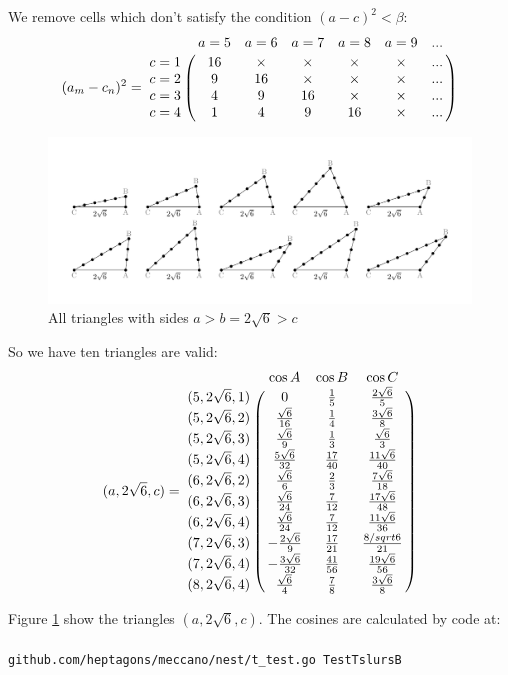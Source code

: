 \documentclass[11pt]{article}
\begin{document}
We remove cells which don't satisfy the condition $(a-c)^2 < \beta$:
\begin {equation}\label{E:12}
(a_m - c_n)^2 =\bordermatrix{~ & a=5 & a=6 & a=7 & a=8 & a=9 & ...\cr
c=1 & 16 & \times & \times & \times & \times & ...\cr    
c=2 &  9 & 16 & \times & \times & \times & ...\cr    
c=3 &  4 &  9 & 16 & \times & \times & ...\cr    
c=4 &  1 &  4 &  9 & 16 & \times & ...\cr}
\end {equation}

\begin{figure}[htp]
\centering
\includegraphics[scale=0.9]{tslurB}
\caption{All triangles with sides $a > b = 2\sqrt{6} > c$}
\label{tslurB}
\end{figure}

So we have ten triangles are valid:
\begin {equation}\label{E:13}
(a,2\sqrt{6},c) =\bordermatrix{~ & \cos{A} & \cos{B} & \cos{C} \cr
(5,2\sqrt{6},1) & 0         & \frac{1}{5} & \frac{2\sqrt{6}}{5} \cr
(5,2\sqrt{6},2) & \frac{\sqrt{6}}{16} & \frac{1}{4} & \frac{3\sqrt{6}}{8} \cr
(5,2\sqrt{6},3) & \frac{\sqrt{6}}{9} & \frac{1}{3} & \frac{\sqrt{6}}{3} \cr
(5,2\sqrt{6},4) & \frac{5\sqrt{6}}{32} & \frac{17}{40} & \frac{11\sqrt{6}}{40} \cr
(6,2\sqrt{6},2) & \frac{\sqrt{6}}{6} & \frac{2}{3} & \frac{7\sqrt{6}}{18} \cr
(6,2\sqrt{6},3) & \frac{\sqrt{6}}{24} & \frac{7}{12} & \frac{17\sqrt{6}}{48} \cr
(6,2\sqrt{6},4) & \frac{\sqrt{6}}{24} & \frac{7}{12} & \frac{11\sqrt{6}}{36} \cr
(7,2\sqrt{6},3) & -\frac{2\sqrt{6}}{9} & \frac{17}{21} & \frac{8/sqrt{6}}{21} \cr
(7,2\sqrt{6},4) & -\frac{3\sqrt{6}}{32} & \frac{41}{56} & \frac{19\sqrt{6}}{56} \cr
(8,2\sqrt{6},4) & \frac{\sqrt{6}}{4} & \frac{7}{8} & \frac{3\sqrt{6}}{8} \cr}
\end{equation}

Figure \ref{tslurB} show the triangles $(a,2\sqrt{6},c)$. The cosines are calculated by code at:
\\\\
\texttt{github.com/heptagons/meccano/nest/t\_test.go TestTslursB}
\end{document}
